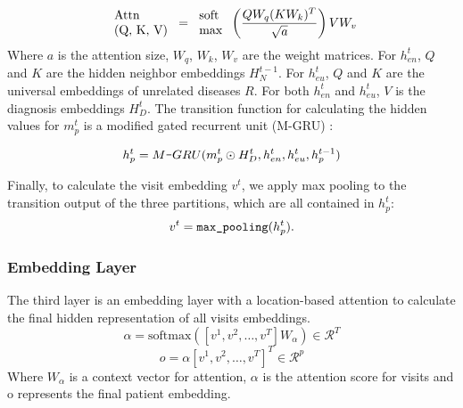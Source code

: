 \documentclass[11pt,a4paper,fleqn]{article}
\begin{document}
\begin{equation}
\begin{tabular}{l}
Attn \\ (Q, K, V) 
\end{tabular}
=
\begin{tabular}{l}
  soft \\
  max
\end{tabular}\left(\frac{QW_q(KW_k)^T}{\sqrt{a}}\right)VW_v 
\end{equation}
\normalsize
Where $a$ is the attention size, $W_q$, $W_k$, $W_v$ are the weight matrices.
For $h_{en}^t$, $Q$ and $K$ are the hidden neighbor embeddings $H_N^{t-1}$. For
$h_{eu}^t$, $Q$ and $K$ are the universal embeddings of unrelated diseases $R$.
For both $h_{en}^t$ and $h_{eu}^t$, $V$ is the diagnosis embeddings $H^{t}_D$.
The transition function for calculating the hidden values for $m_p^t$ is a
modified gated recurrent unit (M-GRU) \cite{gru}:

\begin{equation}
  h_p^t = {M\verb|-|GRU}(m_p^t \odot H_D^t , h_{en}^t, h_{eu}^t, h_p^{t-1})
\end{equation}

Finally, to calculate the visit embedding $v^t$, we apply max pooling to the
transition output of the three partitions, which are all contained in $h_p^t$:
\begin{equation}
  v^t = \verb|max_pooling|(h_p^t).
\end{equation}

\subsubsection{Embedding Layer}
The third layer is an embedding layer with a location-based attention to
calculate the final hidden representation of all visits embeddings.
\begin{equation}
  \alpha=\textrm{softmax}([v^1,v^2,\dots, v^T]W_\alpha)\in \mathcal{R}^T
\end{equation}
\begin{equation}
  o=\alpha[v^1,v^2,\dots, v^T]^T\in\mathcal{R}^p
\end{equation}
Where $W_\alpha$ is a context vector for attention, $\alpha$ is the attention
score for visits and o represents the final patient embedding.
\end{document}

